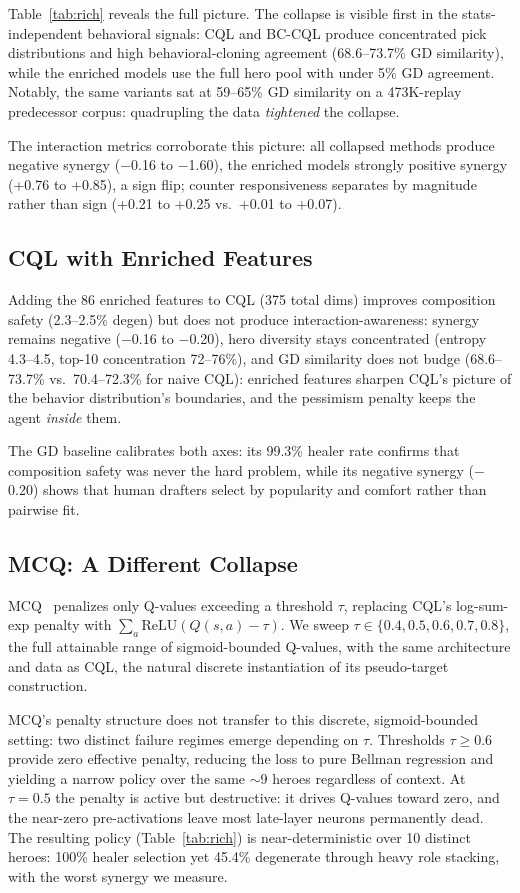 \documentclass[journal]{IEEEtran}
\begin{document}
Table~\ref{tab:rich} reveals the full picture. The collapse is visible first in the stats-independent behavioral signals: CQL and BC-CQL produce concentrated pick distributions and high behavioral-cloning agreement (68.6--73.7\% GD similarity), while the enriched models use the full hero pool with under 5\% GD agreement. Notably, the same variants sat at 59--65\% GD similarity on a 473K-replay predecessor corpus: quadrupling the data \textit{tightened} the collapse.

The interaction metrics corroborate this picture: all collapsed methods produce negative synergy ($-$0.16 to $-$1.60), the enriched models strongly positive synergy (+0.76 to +0.85), a sign flip; counter responsiveness separates by magnitude rather than sign (+0.21 to +0.25 vs.\ +0.01 to +0.07).

\subsection{CQL with Enriched Features}

Adding the 86 enriched features to CQL (375 total dims) improves composition safety (2.3--2.5\% degen) but does not produce interaction-awareness: synergy remains negative ($-$0.16 to $-$0.20), hero diversity stays concentrated (entropy 4.3--4.5, top-10 concentration 72--76\%), and GD similarity does not budge (68.6--73.7\% vs.\ 70.4--72.3\% for naive CQL): enriched features sharpen CQL's picture of the behavior distribution's boundaries, and the pessimism penalty keeps the agent \textit{inside} them.

The GD baseline calibrates both axes: its 99.3\% healer rate confirms that composition safety was never the hard problem, while its negative synergy ($-$0.20) shows that human drafters select by popularity and comfort rather than pairwise fit.

\subsection{MCQ: A Different Collapse}

MCQ~\cite{lyu2022mildly} penalizes only Q-values exceeding a threshold $\tau$, replacing CQL's log-sum-exp penalty with \mbox{$\sum_a \mathrm{ReLU}(Q(s,a) - \tau)$}. We sweep $\tau \in \{0.4, 0.5, 0.6, 0.7, 0.8\}$, the full attainable range of sigmoid-bounded Q-values, with the same architecture and data as CQL, the natural discrete instantiation of its pseudo-target construction.

MCQ's penalty structure does not transfer to this discrete, sigmoid-bounded setting: two distinct failure regimes emerge depending on $\tau$. Thresholds $\tau \geq 0.6$ provide zero effective penalty, reducing the loss to pure Bellman regression and yielding a narrow policy over the same $\sim$9 heroes regardless of context. At $\tau = 0.5$ the penalty is active but destructive: it drives Q-values toward zero, and the near-zero pre-activations leave most late-layer neurons permanently dead. The resulting policy (Table~\ref{tab:rich}) is near-deterministic over 10 distinct heroes: 100\% healer selection yet 45.4\% degenerate through heavy role stacking, with the worst synergy we measure.
\end{document}
